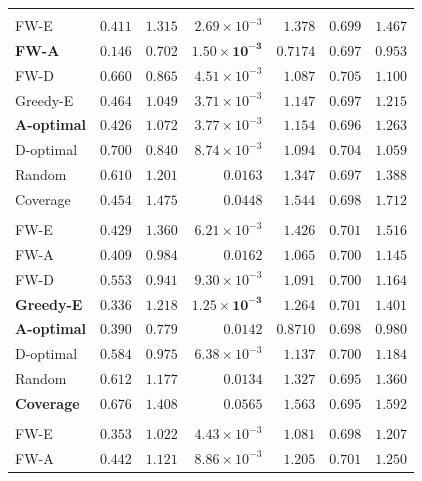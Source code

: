 \documentclass[letterpaper, 9
 pt, conference]{ieeeconf}
\begin{document}
\begin{table}[ht]
\begin{tabular}{lrrrrrr}
\addlinespace[1pt]
\multicolumn{7}{l}{\textit{$K{=}30$}} \\[1pt]
FW-E & $0.411$ & $1.315$ & $2.69\!\times\!10^{-3}$ & $1.378$ & $0.699$ & $1.467$ \\
\textbf{FW-A} & $\mathbf{0.146}$ & $\mathbf{0.702}$ & $\mathbf{1.50\!\times\!10^{-3}}$ & $\mathbf{0.7174}$ & $0.697$ & $\mathbf{0.953}$ \\
FW-D & $0.660$ & $0.865$ & $4.51\!\times\!10^{-3}$ & $1.087$ & $0.705$ & $1.100$ \\
Greedy-E & $0.464$ & $1.049$ & $3.71\!\times\!10^{-3}$ & $1.147$ & $0.697$ & $1.215$ \\
\textbf{A-optimal} & $0.426$ & $1.072$ & $3.77\!\times\!10^{-3}$ & $1.154$ & $\mathbf{0.696}$ & $1.263$ \\
D-optimal & $0.700$ & $0.840$ & $8.74\!\times\!10^{-3}$ & $1.094$ & $0.704$ & $1.059$ \\
Random & $0.610$ & $1.201$ & $0.0163$ & $1.347$ & $0.697$ & $1.388$ \\
Coverage & $0.454$ & $1.475$ & $0.0448$ & $1.544$ & $0.698$ & $1.712$ \\
\addlinespace[1pt]
\multicolumn{7}{l}{\textit{$K{=}40$}} \\[1pt]
FW-E & $0.429$ & $1.360$ & $6.21\!\times\!10^{-3}$ & $1.426$ & $0.701$ & $1.516$ \\
FW-A & $0.409$ & $0.984$ & $0.0162$ & $1.065$ & $0.700$ & $1.145$ \\
FW-D & $0.553$ & $0.941$ & $9.30\!\times\!10^{-3}$ & $1.091$ & $0.700$ & $1.164$ \\
\textbf{Greedy-E} & $\mathbf{0.336}$ & $1.218$ & $\mathbf{1.25\!\times\!10^{-3}}$ & $1.264$ & $0.701$ & $1.401$ \\
\textbf{A-optimal} & $0.390$ & $\mathbf{0.779}$ & $0.0142$ & $\mathbf{0.8710}$ & $0.698$ & $\mathbf{0.980}$ \\
D-optimal & $0.584$ & $0.975$ & $6.38\!\times\!10^{-3}$ & $1.137$ & $0.700$ & $1.184$ \\
Random & $0.612$ & $1.177$ & $0.0134$ & $1.327$ & $0.695$ & $1.360$ \\
\textbf{Coverage} & $0.676$ & $1.408$ & $0.0565$ & $1.563$ & $\mathbf{0.695}$ & $1.592$ \\
\addlinespace[1pt]
\multicolumn{7}{l}{\textit{$K{=}50$}} \\[1pt]
FW-E & $0.353$ & $1.022$ & $4.43\!\times\!10^{-3}$ & $1.081$ & $0.698$ & $1.207$ \\
FW-A & $0.442$ & $1.121$ & $8.86\!\times\!10^{-3}$ & $1.205$ & $0.701$ & $1.250$ \\

\end{tabular}
\end{table}
\end{document}

